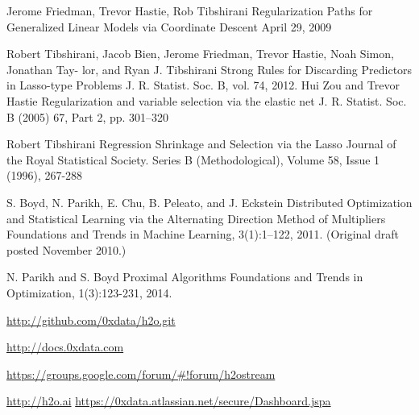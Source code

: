 \documentclass[11pt]{article}
\begin{document}
\begin{itemize}

\end{itemize}



\newpage

\begin{thebibliography}{9}

Jerome Friedman, Trevor Hastie, Rob Tibshirani
Regularization Paths for Generalized Linear Models via Coordinate Descent
April 29, 2009

  Robert Tibshirani, Jacob Bien, Jerome Friedman, Trevor Hastie, Noah Simon, Jonathan Tay- lor, and Ryan J. Tibshirani
  Strong Rules for Discarding Predictors in Lasso-type Problems
  J. R. Statist. Soc. B, vol. 74, 
  2012.
Hui Zou and Trevor Hastie
Regularization and variable selection via the elastic net
J. R. Statist. Soc. B (2005) 67, Part 2, pp. 301–320

Robert Tibshirani
Regression Shrinkage and Selection via the Lasso
Journal of the Royal Statistical Society. Series B (Methodological), Volume 58, Issue 1 (1996), 267-288

S. Boyd, N. Parikh, E. Chu, B. Peleato, and J. Eckstein
Distributed Optimization and Statistical Learning via the Alternating Direction Method of Multipliers
Foundations and Trends in Machine Learning, 3(1):1–122, 2011. (Original draft posted November 2010.)

N. Parikh and S. Boyd
Proximal Algorithms
Foundations and Trends in Optimization, 1(3):123-231, 2014.

\url{http://github.com/0xdata/h2o.git}

\url{http://docs.0xdata.com}

\url{https://groups.google.com/forum/#!forum/h2ostream}

\url{http://h2o.ai}
\url{https://0xdata.atlassian.net/secure/Dashboard.jspa}
\end{thebibliography}

\end{document}
